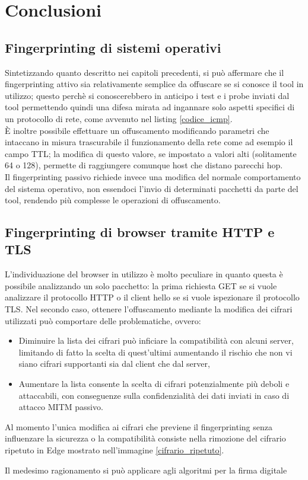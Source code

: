 \chapter{Conclusioni}
\section{Fingerprinting di sistemi operativi}
Sintetizzando quanto descritto nei capitoli precedenti, si può affermare che il fingerprinting attivo sia relativamente semplice da offuscare se si conosce il tool in utilizzo; questo perchè si conoscerebbero in anticipo i test e i probe inviati dal tool permettendo quindi una difesa mirata ad ingannare solo aspetti specifici di un protocollo di rete, come avvenuto nel listing \ref{codice_icmp}.
\\
È inoltre possibile effettuare un offuscamento modificando parametri che intaccano in misura trascurabile il funzionamento della rete come ad esempio il campo TTL; la modifica di questo valore, se impostato a valori alti (solitamente 64 o 128), permette di raggiungere comunque host che distano parecchi hop.
\\
Il fingerprinting passivo richiede invece una modifica del normale comportamento del sistema operativo, non essendoci l'invio di determinati pacchetti da parte del tool, rendendo più complesse le operazioni di offuscamento.

\section{Fingerprinting di browser tramite HTTP e TLS}
L'individuazione del browser in utilizzo è molto peculiare in quanto questa è possibile analizzando un solo pacchetto: la prima richiesta GET se si vuole analizzare il protocollo HTTP o il client hello se si vuole ispezionare il protocollo TLS.
Nel secondo caso, ottenere l'offuscamento mediante la modifica dei cifrari utilizzati può comportare delle problematiche, ovvero:
\begin{itemize}
	\item Diminuire la lista dei cifrari può inficiare la compatibilità con alcuni server, limitando di fatto la scelta di quest'ultimi aumentando il rischio che non vi siano cifrari supportanti sia dal client che dal server,
	\item Aumentare la lista consente la scelta di cifrari potenzialmente più deboli e attaccabili, con conseguenze sulla confidenzialità dei dati inviati in caso di attacco MITM passivo.
\end{itemize}

Al momento l'unica modifica ai cifrari che previene il fingerprinting senza influenzare la sicurezza o la compatibilità consiste nella rimozione del cifrario ripetuto in Edge mostrato nell'immagine \ref{cifrario_ripetuto}.

Il medesimo ragionamento si può applicare agli algoritmi per la firma digitale


